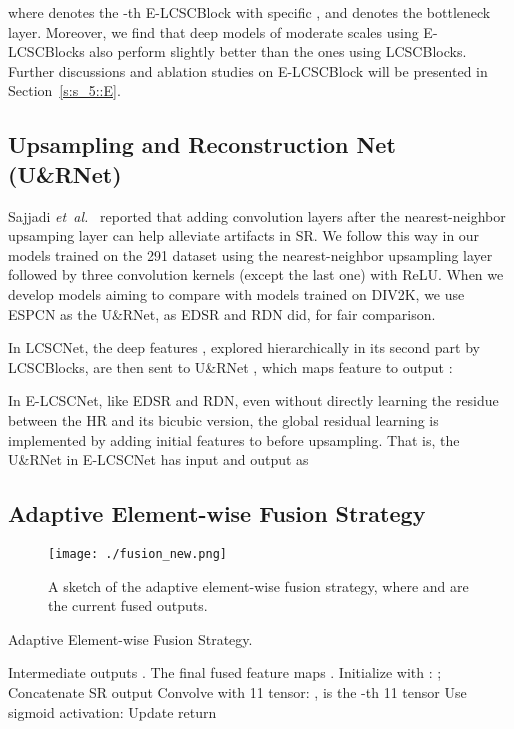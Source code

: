 \documentclass[journal]{IEEEtran}
\begin{document}
where  denotes the -th E-LCSCBlock with specific , and  denotes the  bottleneck layer. Moreover, we find that deep models of moderate scales using E-LCSCBlocks also perform slightly better than the ones using LCSCBlocks. Further discussions and ablation studies on E-LCSCBlock will be presented in Section~\ref{s:s_5::E}.


\subsection{Upsampling and Reconstruction Net (U\&RNet)}

Sajjadi \emph{et~al.}~\cite{sajjadi2016enhancenet} reported that adding convolution layers after the nearest-neighbor upsamping layer can help alleviate artifacts in SR. We follow this way in our models trained on the 291 dataset using the nearest-neighbor upsampling layer followed by three  convolution kernels (except the last one) with ReLU. When we develop models aiming to compare with models trained on DIV2K, we use ESPCN as the U\&RNet, as EDSR and RDN did, for fair comparison.


In LCSCNet, the deep features , explored hierarchically in its second part by LCSCBlocks, are then sent to U\&RNet , which maps feature  to output :


In E-LCSCNet, like EDSR and RDN, even without directly learning the residue between the HR and its bicubic version, the global residual learning is implemented by adding initial features  to  before upsampling. That is, the U\&RNet  in E-LCSCNet has input and output as


\subsection{Adaptive Element-wise Fusion Strategy}

\begin{figure*}[htbp]
\centering
\texttt{[image: ./fusion\_new.png]}
\caption{\small A sketch of the adaptive element-wise fusion strategy, where  and   are the current fused outputs.}
\label{fig:F5}
\end{figure*}

\begin{algorithm}[ht]  
  \caption{Adaptive Element-wise Fusion Strategy.}  
  \begin{algorithmic}[1]
    \Require   
      Intermediate outputs .
    \Ensure  
      The final fused feature maps . 
    \State Initialize  with : ;   
      \State Concatenate SR output 
      \State Convolve with 11 tensor: ,  is the -th 11 tensor
      \State Use sigmoid activation: 
      \State Update 
    \EndFor 
    \State return  
  \end{algorithmic}\label{alg1}  
\end{algorithm} 
\end{document}
